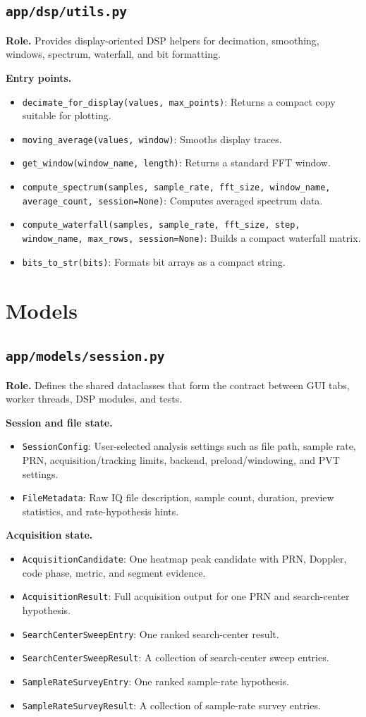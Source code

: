 \documentclass[11pt,a4paper]{article}
\newcommand{\codepath}[1]{\nolinkurl{#1}}
\newcommand{\codeheading}[1]{\texorpdfstring{\codepath{#1}}{#1}}
\newcommand{\codesym}[1]{\nolinkurl{#1}}
\newcommand{\apiitem}[2]{\item \codesym{#1}: #2}
\begin{document}
\subsection{\codeheading{app/dsp/utils.py}}

\textbf{Role.} Provides display-oriented DSP helpers for decimation, smoothing, windows, spectrum, waterfall, and bit formatting.

\textbf{Entry points.}
\begin{itemize}
  \apiitem{decimate_for_display(values, max_points)}{Returns a compact copy suitable for plotting.}
  \apiitem{moving_average(values, window)}{Smooths display traces.}
  \apiitem{get_window(window_name, length)}{Returns a standard FFT window.}
  \apiitem{compute_spectrum(samples, sample_rate, fft_size, window_name, average_count, session=None)}{Computes averaged spectrum data.}
  \apiitem{compute_waterfall(samples, sample_rate, fft_size, step, window_name, max_rows, session=None)}{Builds a compact waterfall matrix.}
  \apiitem{bits_to_str(bits)}{Formats bit arrays as a compact string.}
\end{itemize}

\section{Models}

\subsection{\codeheading{app/models/session.py}}

\textbf{Role.} Defines the shared dataclasses that form the contract between GUI tabs, worker threads, DSP modules, and tests.

\textbf{Session and file state.}
\begin{itemize}
  \apiitem{SessionConfig}{User-selected analysis settings such as file path, sample rate, PRN, acquisition/tracking limits, backend, preload/windowing, and PVT settings.}
  \apiitem{FileMetadata}{Raw IQ file description, sample count, duration, preview statistics, and rate-hypothesis hints.}
\end{itemize}

\textbf{Acquisition state.}
\begin{itemize}
  \apiitem{AcquisitionCandidate}{One heatmap peak candidate with PRN, Doppler, code phase, metric, and segment evidence.}
  \apiitem{AcquisitionResult}{Full acquisition output for one PRN and search-center hypothesis.}
  \apiitem{SearchCenterSweepEntry}{One ranked search-center result.}
  \apiitem{SearchCenterSweepResult}{A collection of search-center sweep entries.}
  \apiitem{SampleRateSurveyEntry}{One ranked sample-rate hypothesis.}
  \apiitem{SampleRateSurveyResult}{A collection of sample-rate survey entries.}
\end{itemize}
\end{document}
